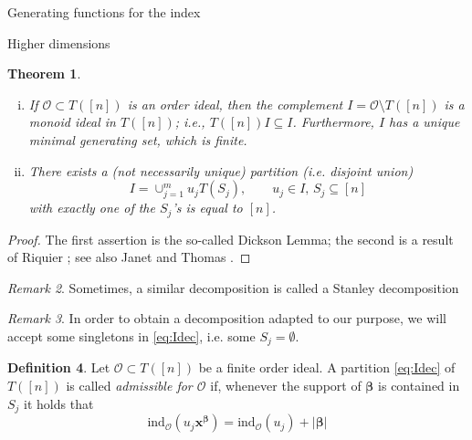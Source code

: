 \documentclass[reqno,a4paper,10pt]{amsart}
\theoremstyle{definition}
\newtheorem{definition}{Definition}
\theoremstyle{remark}
\newtheorem{remark}[definition]{Remark}
\theoremstyle{plain}
\newtheorem{theorem}[definition]{Theorem}
\newcommand{\vek}[1]{\boldsymbol{#1}}
\newcommand{\tdeg}[1]{\lvert #1 \rvert}
\newcommand{\ind}{\mathrm{ind}}
\begin{document}
\begin{section}{Generating functions for the index}
\begin{subsection}{Higher dimensions}
  \begin{theorem}
    \begin{enumerate}[(i)]
    \item If \(\mathcal{O} \subset T([n])\) is an order ideal, then the
      complement \(I = \mathcal{O} \setminus T([n])\) is a monoid
      ideal in \(T([n])\); i.e., \(T([n]) I \subseteq
      I\). Furthermore, \(I\) has a unique minimal generating set,
      which is finite.
    \item There exists a  (not necessarily unique) partition (i.e.
      disjoint union)
      \begin{equation}
        \label{eq:Idec}
        I = \cup_{j=1}^m u_j T(S_j), \qquad u_j \in I, \,  S_j \subseteq [n]
      \end{equation}
      with exactly one of the \(S_j\)'s is equal to \([n]\).
    \end{enumerate}    
  \end{theorem}
  \begin{proof}
    The first assertion is the so-called Dickson Lemma; the second is
    a result of Riquier \cite{Riq:Decomp}; see also Janet \cite{Janet:part} and Thomas \cite{Thomas:RET}.
      \end{proof}

      \begin{remark}
        Sometimes, a similar decomposition is called a Stanley decomposition
        \cite{stanley1982linear,apel2003conjecture}
  \end{remark}

  \begin{remark}
    In order to obtain a decomposition adapted to our purpose,
    we will accept some singletons in \eqref{eq:Idec}, i.e. some
    \(S_j=\emptyset\). 
  \end{remark}
  

  
  \begin{definition}
    Let \(\mathcal{O} \subset T([n])\) be a finite order ideal. A
    partition \eqref{eq:Idec} of \(T([n])\) is called
    \emph{admissible for \(\mathcal{O}\)} if, whenever
    the support of \(\vek{\beta}\) is contained in \(S_j\) it holds
    that 
    \begin{equation}
      \label{eq:indInc}
      \ind_{\mathcal{O}}(u_j\vek{x}^{\vek{\beta}}) =
      \ind_{\mathcal{O}}(u_j) + \tdeg{\vek{\beta}}    
    \end{equation}
  \end{definition}
  



\end{subsection}
\end{section}
\end{document}
